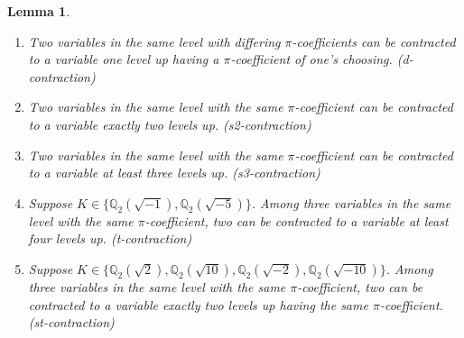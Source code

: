 \documentclass[12pt]{amsart}
\newtheorem{lemma}{Lemma}
\begin{document}
\begin{lemma}~
\begin{enumerate}
    \item Two variables in the same level with differing $\pi$-coefficients can be contracted to a variable one level up having a $\pi$-coefficient of one's choosing. (\textit{d}-contraction)
    
    \item Two variables in the same level with the same $\pi$-coefficient can be contracted to a variable exactly two levels up. (\textit{s2}-contraction)
    
    \item Two variables in the same level with the same $\pi$-coefficient can be contracted to a variable at least three levels up. (\textit{s3}-contraction)
    
    \item Suppose $K \in \{\mathbb{Q}_2(\sqrt{-1}), \mathbb{Q}_2(\sqrt{-5})\}$.  Among three variables in the same level with the same $\pi$-coefficient, two can be contracted to a variable at least four levels up. (\textit{t}-contraction)
    
    \item Suppose $K \in \{\mathbb{Q}_2(\sqrt{2}), \mathbb{Q}_2(\sqrt{10}), \mathbb{Q}_2(\sqrt{-2}), \mathbb{Q}_2(\sqrt{-10})\}$.  Among three variables in the same level with the same $\pi$-coefficient, two can be contracted to a variable exactly two levels up having the same $\pi$-coefficient. (\textit{st}-contraction)
\end{enumerate}
\end{lemma}
\end{document}
